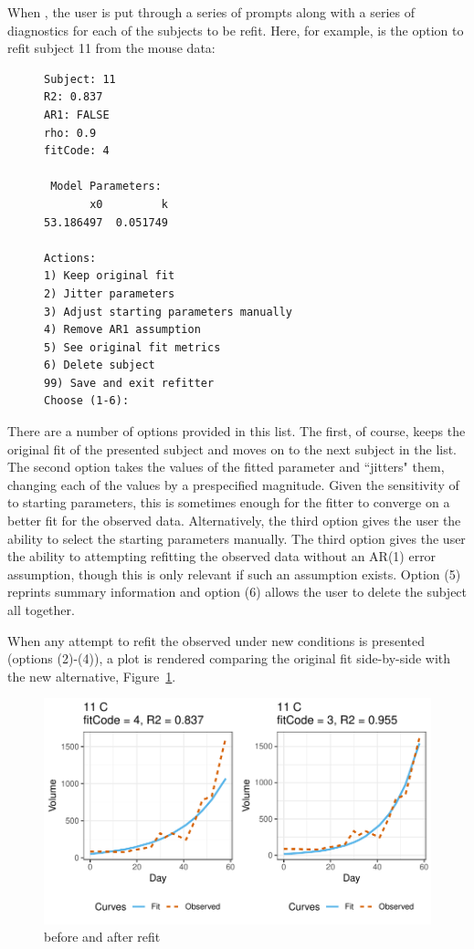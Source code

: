 When , the user is put through a series of prompts along with a series of diagnostics for each of the subjects to be refit. Here, for example, is the option to refit subject 11 from the mouse data:


\begin{singlespace}
\begin{figure}[H]
\centering
\begin{BVerbatim}
Subject: 11
R2: 0.837
AR1: FALSE
rho: 0.9
fitCode: 4

 Model Parameters:
       x0         k 
53.186497  0.051749 

Actions:
1) Keep original fit
2) Jitter parameters
3) Adjust starting parameters manually
4) Remove AR1 assumption
5) See original fit metrics
6) Delete subject
99) Save and exit refitter
Choose (1-6):
\end{BVerbatim}
\end{figure}
\end{singlespace}

There are a number of options provided in this list. The first, of course, keeps the original fit of the presented subject and moves on to the next subject in the list. The second option takes the values of the fitted parameter and ``jitters" them, changing each of the values by a prespecified magnitude. Given the sensitivity of  to starting parameters, this is sometimes enough for the fitter to converge on a better fit for the observed data. Alternatively, the third option gives the user the ability to select the starting parameters manually. The third option gives the user the ability to attempting refitting the observed data without an AR(1) error assumption, though this is only relevant if such an assumption exists. Option (5) reprints summary information and option (6) allows the user to delete the subject all together.

When any attempt to refit the observed under new conditions is presented (options (2)-(4)), a plot is rendered comparing the original fit side-by-side with the new alternative, Figure~\ref{fig:refit_plot}.

\begin{figure}[H]
\centering
\includegraphics{img/mouse_refit_plot.pdf}
\caption{before and after refit}
\label{fig:refit_plot}
\end{figure}

